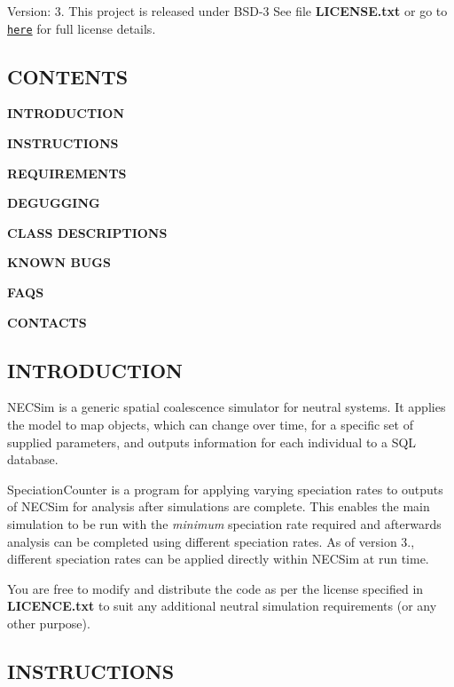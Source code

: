 Version\+: 3. This project is released under B\+S\+D-\/3 See file {\bfseries L\+I\+C\+E\+N\+S\+E.\+txt} or go to \href{https://opensource.org/licenses/BSD-3-Clause}{\tt here} for full license details.

\subsection*{C\+O\+N\+T\+E\+N\+TS}


\begin{DoxyItemize}
\item {\bfseries I\+N\+T\+R\+O\+D\+U\+C\+T\+I\+ON}
\item {\bfseries I\+N\+S\+T\+R\+U\+C\+T\+I\+O\+NS}
\item {\bfseries R\+E\+Q\+U\+I\+R\+E\+M\+E\+N\+TS}
\item {\bfseries D\+E\+G\+U\+G\+G\+I\+NG}
\item {\bfseries C\+L\+A\+SS D\+E\+S\+C\+R\+I\+P\+T\+I\+O\+NS}
\item {\bfseries K\+N\+O\+WN B\+U\+GS}
\item {\bfseries F\+A\+QS}
\item {\bfseries C\+O\+N\+T\+A\+C\+TS}
\end{DoxyItemize}

\subsection*{I\+N\+T\+R\+O\+D\+U\+C\+T\+I\+ON}

N\+E\+C\+Sim is a generic spatial coalescence simulator for neutral systems. It applies the model to map objects, which can change over time, for a specific set of supplied parameters, and outputs information for each individual to a S\+QL database.

Speciation\+Counter is a program for applying varying speciation rates to outputs of N\+E\+C\+Sim for analysis after simulations are complete. This enables the main simulation to be run with the {\itshape minimum} speciation rate required and afterwards analysis can be completed using different speciation rates. As of version 3., different speciation rates can be applied directly within N\+E\+C\+Sim at run time.

You are free to modify and distribute the code as per the license specified in {\bfseries L\+I\+C\+E\+N\+C\+E.\+txt} to suit any additional neutral simulation requirements (or any other purpose).

\subsection*{I\+N\+S\+T\+R\+U\+C\+T\+I\+O\+NS}

